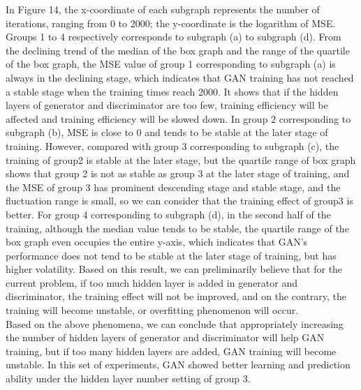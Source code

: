 \documentclass[11pt,a4paper]{article}
\begin{document}
In Figure 14, the x-coordinate of each subgraph represents the number of iterations, ranging from 0 to 2000; the y-coordinate is the logarithm of MSE. Groups 1 to 4 respectively corresponds to subgraph (a) to subgraph (d). From the declining trend of the median of the box graph and the range of the quartile of the box graph, the MSE value of group 1 corresponding to subgraph (a) is always in the declining stage, which indicates that GAN training has not reached a stable stage when the training times reach 2000. It shows that if the hidden layers of generator and discriminator are too few, training efficiency will be affected and training efficiency will be slowed down. In group 2 corresponding to subgraph (b), MSE is close to 0 and tends to be stable at the later stage of training. However, compared with group 3 corresponding to subgraph (c), the training of group2 is stable at the later stage, but the quartile range of box graph shows that group 2 is not as stable as group 3 at the later stage of training, and the MSE of group 3 has prominent descending stage and stable stage, and the fluctuation range is small, so we can consider that the training effect of group3 is better. For group 4 corresponding to subgraph (d), in the second half of the training, although the median value tends to be stable, the quartile range of the box graph even occupies the entire y-axis, which indicates that GAN's performance does not tend to be stable at the later stage of training, but has higher volatility. Based on this result, we can preliminarily believe that for the current problem, if too much hidden layer is added in generator and discriminator, the training effect will not be improved, and on the contrary, the training will become unstable, or overfitting phenomenon will occur.
\\
\newline
Based on the above phenomena, we can conclude that appropriately increasing the number of hidden layers of generator and discriminator will help GAN training, but if too many hidden layers are added, GAN training will become unstable. In this set of experiments, GAN showed better learning and prediction ability under the hidden layer number setting of group 3.
\newpage
\end{document}
